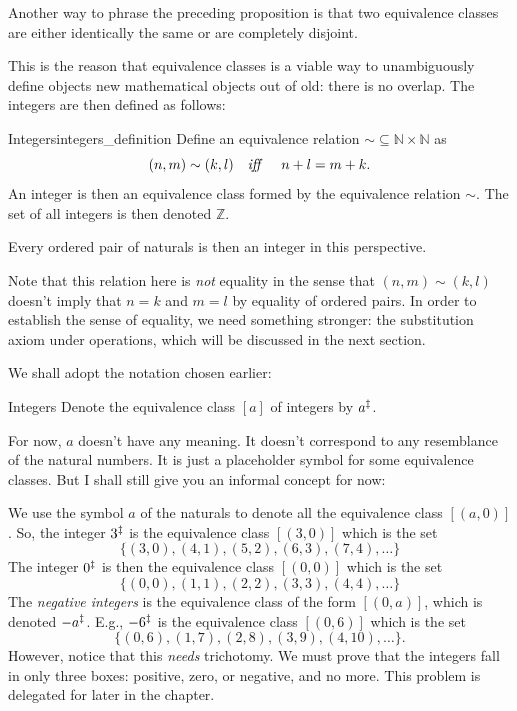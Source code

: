 Another way to phrase the preceding proposition is that two equivalence classes are either
identically the same or are completely disjoint.

This is the reason that equivalence classes is a viable way to unambiguously define objects new
mathematical objects out of old: there is no overlap. The integers are then defined as follows:

\begin{df}{Integers}{integers_definition}
  Define an equivalence relation \(\mathord{\sim} \subseteq \mathbb{N} \times \mathbb{N}\) as
  \begin{equation}
    (n, m) \sim (k, l) \quad \textrm{\emph{iff}~} \quad n + l = m + k.
  \end{equation}
  An integer is then an equivalence class formed by the equivalence relation \(\sim\). The set of
  all integers is then denoted \(\mathbb{Z}\).

  Every ordered pair of naturals is then an integer in this perspective.
\end{df}

Note that this relation here is \emph{not} equality in the sense that \((n, m) \sim (k, l)\) doesn't
imply that \(n = k\) and \(m = l\) by equality of ordered pairs. In order to establish the sense of
equality, we need something stronger: the substitution axiom under operations, which will be
discussed in the next section.

We shall adopt the notation chosen earlier:
\begin{notation}{Integers}{}
  Denote the equivalence class \([a]\) of integers by \(a^{\ddagger}\).
\end{notation}
For now, \(a\) doesn't have any meaning. It doesn't correspond to any resemblance of the natural
numbers. It is just a placeholder symbol for some equivalence classes. But I shall still give you an
informal concept for now:

We use the symbol \(a\) of the naturals to denote all the equivalence class \([(a, 0)]\). So, the
integer \(3^{\ddagger}\) is the equivalence class \([(3, 0)]\) which is the set
\begin{equation}
  \{(3, 0), (4, 1), (5, 2), (6, 3), (7, 4), \dots\}
\end{equation}
The integer \(0^{\ddagger}\) is then the equivalence class \([(0, 0)]\) which is the set
\begin{equation}
  \{(0, 0), (1, 1), (2, 2), (3, 3), (4, 4), \dots\}
\end{equation}
The \emph{negative integers} is the equivalence class of the form \([(0, a)]\), which is denoted
\(-a^{\ddagger}\). E.g., \(-6^{\ddagger}\) is the equivalence class \([(0, 6)]\) which is the set
\begin{equation}
  \{(0, 6), (1, 7), (2, 8), (3, 9), (4, 10), \dots\}.
\end{equation}
However, notice that this \emph{needs} trichotomy. We must prove that the integers fall in only
three boxes: positive, zero, or negative, and no more. This problem is delegated for later in the
chapter.

